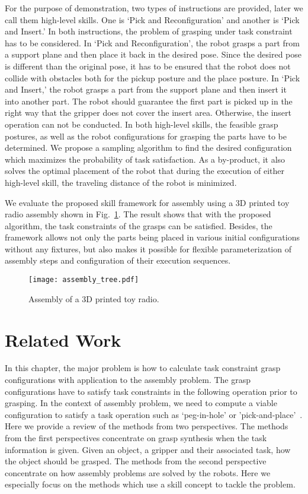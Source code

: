 For the purpose of demonstration, two types of instructions are provided, later we call them high-level skills.  One is `Pick and Reconfiguration' and another is `Pick and Insert.' In both instructions, the problem of grasping under task constraint has to be considered. In `Pick and Reconfiguration', the robot grasps a part from a support plane and then place it back in the desired pose. Since the desired pose is different than the original pose, it has to be ensured that the robot does not collide with obstacles both for the pickup posture and the place posture. In `Pick and Insert,' the robot grasps a part from the support plane and then insert it into another part. The robot should guarantee the first part is picked up in the right way that the gripper does not cover the insert area. Otherwise, the insert operation can not be conducted. In both high-level skills, the feasible grasp postures, as well as the robot configurations for grasping the parts have to be determined. We propose a sampling algorithm to find the desired configuration which maximizes the probability of task satisfaction. As a by-product, it also solves the optimal placement of the robot that during the execution of either high-level skill, the traveling distance of the robot is minimized. 

We evaluate the proposed skill framework for assembly using a 3D printed toy radio assembly shown in Fig.~\ref{fig:assembly_tree}. The result shows that with the proposed algorithm, the task constraints of the grasps can be satisfied. Besides, the framework allows not only the parts being placed in various initial configurations without any fixtures, but also makes it possible for flexible parameterization of assembly steps and configuration of their execution sequences. 
\begin{figure}[!htbp]
\centering
\texttt{[image: assembly\_tree.pdf]}
\captionsetup{justification=raggedright}
\caption{Assembly of a 3D printed toy radio.}
\label{fig:assembly_tree}
\end{figure} 

\section{Related Work}
In this chapter, the major problem is how to calculate task constraint grasp configurations with application to the assembly problem. The grasp configurations have to satisfy task constraints in the following operation prior to grasping. In the context of assembly problem, we need to compute a viable configuration  to satisfy a task operation such as `peg-in-hole' or 'pick-and-place'~\cite{Holz2015}. Here we provide a review of the methods from two perspectives. The methods from the first perspectives concentrate on grasp synthesis when the task information is given. Given an object, a gripper and their associated task, how the object should be grasped. The methods from the second perspective concentrate on how assembly problems are solved by the robots. Here we especially focus on the methods which use a skill concept to tackle the problem. 

